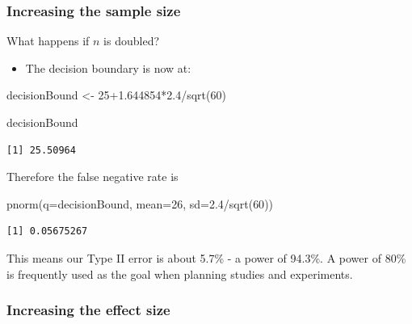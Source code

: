 \documentclass[
  oneside]{krantz}
\newenvironment{Shaded}{\begin{snugshade}}{\end{snugshade}}
\newcommand{\AttributeTok}[1]{\textcolor[rgb]{0.77,0.63,0.00}{#1}}
\newcommand{\DecValTok}[1]{\textcolor[rgb]{0.00,0.00,0.81}{#1}}
\newcommand{\FloatTok}[1]{\textcolor[rgb]{0.00,0.00,0.81}{#1}}
\newcommand{\FunctionTok}[1]{\textcolor[rgb]{0.00,0.00,0.00}{#1}}
\newcommand{\NormalTok}[1]{#1}
\newcommand{\OtherTok}[1]{\textcolor[rgb]{0.56,0.35,0.01}{#1}}
\newcommand{\SpecialCharTok}[1]{\textcolor[rgb]{0.00,0.00,0.00}{#1}}
\providecommand{\tightlist}{%
  \setlength{\itemsep}{0pt}\setlength{\parskip}{0pt}}
\begin{document}
\hypertarget{increasing-the-sample-size}{%
\subsubsection{Increasing the sample size}\label{increasing-the-sample-size}}

What happens if \(n\) is doubled?

\begin{itemize}
\tightlist
\item
  The decision boundary is now at:
\end{itemize}

\begin{Shaded}
\begin{Highlighting}[]
\NormalTok{decisionBound }\OtherTok{\textless{}{-}} \DecValTok{25}\FloatTok{+1.644854}\SpecialCharTok{*}\FloatTok{2.4}\SpecialCharTok{/}\FunctionTok{sqrt}\NormalTok{(}\DecValTok{60}\NormalTok{)}

\NormalTok{decisionBound}
\end{Highlighting}
\end{Shaded}

\begin{verbatim}
[1] 25.50964
\end{verbatim}

Therefore the false negative rate is

\begin{Shaded}
\begin{Highlighting}[]
\FunctionTok{pnorm}\NormalTok{(}\AttributeTok{q=}\NormalTok{decisionBound, }\AttributeTok{mean=}\DecValTok{26}\NormalTok{, }\AttributeTok{sd=}\FloatTok{2.4}\SpecialCharTok{/}\FunctionTok{sqrt}\NormalTok{(}\DecValTok{60}\NormalTok{))}
\end{Highlighting}
\end{Shaded}

\begin{verbatim}
[1] 0.05675267
\end{verbatim}

This means our Type II error is about 5.7\% - a power of 94.3\%. A power of 80\% is frequently used as the goal when planning studies and experiments.

\hypertarget{increasing-the-effect-size}{%
\subsubsection{Increasing the effect size}\label{increasing-the-effect-size}}
\end{document}
